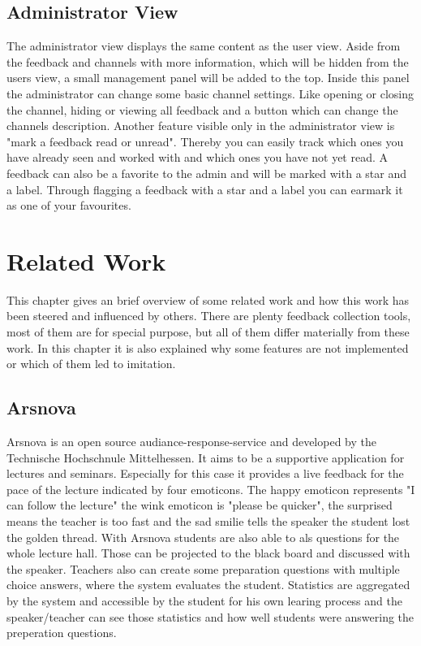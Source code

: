 \section{Administrator View}
The administrator view displays the same content as the user view. Aside from the feedback and channels with more information, which will be hidden from the users view, a small management panel will be added to the top. Inside this panel the administrator can change some basic channel settings. Like opening or closing the channel, hiding or viewing all feedback and a button which can change the channels description.
Another feature visible only in the administrator view is "mark a feedback read or unread". Thereby you can easily track which ones you have already seen and worked with and which ones you have not yet read. A feedback can also be a favorite to the admin and will be marked with a star and a label. Through flagging a feedback with a star and a label you can earmark it as one of your favourites.


\chapter{Related Work}
This chapter gives an brief overview of some related work and how this work has been steered and influenced by others. There are plenty feedback collection tools, most of them are for special purpose, but all of them differ materially from these work. In this chapter it is also explained why some features are not implemented or which of them led to imitation. 
\section{Arsnova}
Arsnova is an open source audiance-response-service and developed by the Technische Hochschnule Mittelhessen. It aims to be a supportive application for lectures and seminars. Especially for this case it provides a live feedback for the pace of the lecture indicated by four emoticons. The happy emoticon represents "I can follow the lecture" the wink emoticon is "please be quicker", the surprised means the teacher is too fast and the sad smilie tells the speaker the student lost the golden thread. 
With Arsnova students are also able to als questions for the whole lecture hall. Those can be projected to the black board and discussed with the speaker. Teachers also can create some preparation questions with multiple choice answers, where the system evaluates the student. 
Statistics are aggregated by the system and accessible by the student for his own learing process and the speaker/teacher can see those statistics and how well students were answering the preperation questions.

